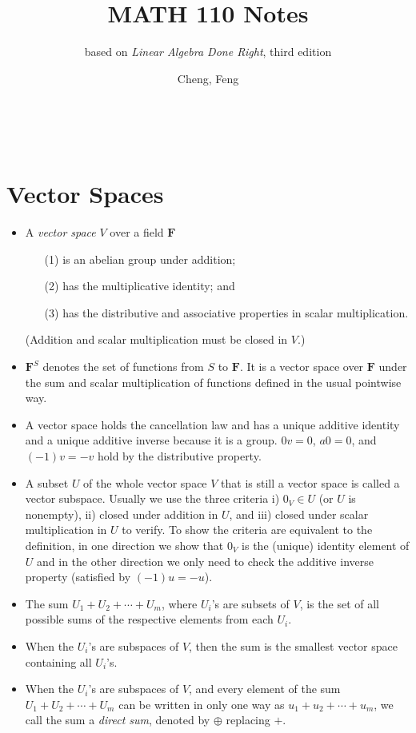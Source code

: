 \documentclass[11pt]{article}
\title{MATH 110 Notes}
\author{Cheng, Feng}
\subtitle{based on \textit{Linear Algebra Done Right}, third edition}
\makeatletter
\newcommand{\df}[1]{\textit{\textsf{#1}}}
\newcommand{\F}{\mathbf{F}}
\let\@subtitle\@empty %
\newcommand{\makemytitle}{
    \begin{center}
        {\Large \@title}
        \@subtitle
        \vspace{0.5em}
        \\ \@author
        \vspace{-0.5em}
    \end{center}
}
\makeatother
\begin{document}
\makemytitle

\tableofcontents
\newpage

\section{Vector Spaces}
\begin{itemize}
    \item A \df{vector space} $V$ over a field $\F$
    \begin{enumerate}
    \item [(1)] is an abelian group under addition;
    \item [(2)] has the multiplicative identity; and
    \item [(3)] has the distributive and associative properties in scalar multiplication.
    \end{enumerate}
    (Addition and scalar multiplication must be closed in $V$.)
    \item $\F^S$ denotes the set of functions from $S$ to $\F$. It is a vector space over $\F$ under the sum and scalar multiplication of functions defined in the usual pointwise way.
    \item A vector space holds the cancellation law and has a unique additive identity and a unique additive inverse because it is a group. $0v = 0$, $a0 = 0$, and $(-1)v = -v$ hold by the distributive property.
    \item A subset $U$ of the whole vector space $V$ that is still a vector space is called a vector subspace. Usually we use the three criteria i) $0_V \in U$ (or $U$ is nonempty), ii) closed under addition in $U$, and iii) closed under scalar multiplication in $U$ to verify. To show the criteria are equivalent to the definition, in one direction we show that $0_V$ is the (unique) identity element of $U$ and in the other direction we only need to check the additive inverse property (satisfied by $(-1)u = -u$).
    \item The sum $U_1 + U_2 +\cdots+ U_m$, where $U_i$'s are subsets of $V$, is the set of all possible sums of the respective elements from each $U_i$.
    \item When the $U_i$'s are subspaces of $V$, then the sum is the smallest vector space containing all $U_i$'s.
    \item When the $U_i$'s are subspaces of $V$, and every element of the sum $U_1 + U_2 +\cdots+ U_m$ can be written in only one way as $u_1+u_2+\cdots+u_m$, we call the sum a \df{direct sum}, denoted by $\oplus$ replacing $+$.

\end{itemize}
\end{document}
